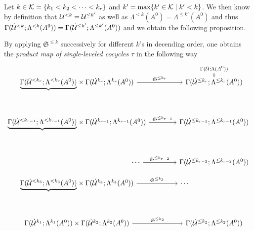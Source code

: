 Let $k\in\mathcal{K}=\{k_1<k_2<\dots<k_r\}$ and $k'=\max\{k'\in\mathcal{K}\mid k'<k\}$. We then
know by definition that $\mathcal{U}^{<k}=\mathcal{U}^{\leq k'}$ as well as
$\Lambda^{< k}(A^0)=\Lambda^{\leq k'}(A^0)$ and thus
$\Gamma(\dot{\mathcal{U}}^{< k};\Lambda^{< k}(A^0))=
\Gamma(\dot{\mathcal{U}}^{\leq k'};\Lambda^{\leq k'}(A^0))$ and we obtain the following
proposition.
\begin{prop}\label{prop:theMapTau}
  By applying $\mathfrak{S}^{\leq k}$ successively for different $k$'s
  in decending order, one obtains the \emph{product map of single-leveled
  cocycles $\tau$} in the following way
  \[ \begin{tikzcd}[column sep=1.4cm,row sep=.4cm]
      \underset{\tikzmark{e1}}{\underbrace{%
        \Gamma(\dot\cU^{<k_r};\Lambda^{<k_r}(A^0))}}
      \times
      \Gamma(\dot\cU^{k_r};\Lambda^{k_r}(A^0))
      \rar{\mathfrak{S}^{\leq k_r}}&
      \overset{\normalsize\Gamma(\dot\cU;\Lambda(A^0))}{%
        \overset{\normalsize\text{\rotatebox[origin=c]{-90}{$=$}}}{%
          \Gamma(\dot\cU^{\leq k_r};\Lambda^{\leq k_r}(A^0))
      }}
      \\\\\underset{\tikzmark{e2}}{\underbrace{%
        \Gamma(\dot\cU^{<k_{r-1}};\Lambda^{<k_{r-1}}(A^0))}}
      \times
      \Gamma(\dot\cU^{k_{r-1}};\Lambda^{k_{r-1}}(A^0))
      \rar{\mathfrak{S}^{\leq k_{r-1}}}&
      \overset{\tikzmark{n1}}{%
        \Gamma(\dot\cU^{\leq k_{r-1}};\Lambda^{\leq k_{r-1}}(A^0))}
      \\\\\hspace{6cm}\cdots \rar{\mathfrak{S}^{\leq k_{r-2}}}&
      \overset{\tikzmark{n2}}{%
        \Gamma(\dot\cU^{\leq k_{r-2}};\Lambda^{\leq k_{r-2}}(A^0))}
      \\\underset{\tikzmark{eEND}}{\underbrace{%
        \Gamma(\dot\cU^{<k_3};\Lambda^{<k_3}(A^0))}}
      \times
      \Gamma(\dot\cU^{k_3};\Lambda^{k_3}(A^0))
      \rar{\mathfrak{S}^{\leq k_3}}&
      \cdots\hspace{3cm}
      \\\\
      \Gamma(\dot\cU^{k_1};\Lambda^{k_1}(A^0))
      \times
      \Gamma(\dot\cU^{k_2};\Lambda^{k_2}(A^0))
      \rar{\mathfrak{S}^{\leq k_2}}&
      \overset{\tikzmark{nEND}}{%
        \Gamma(\dot\cU^{\leq k_2};\Lambda^{\leq k_2}(A^0))}
  \end{tikzcd} \]
\end{prop}
